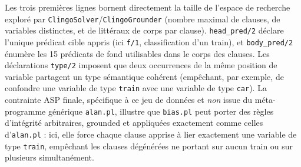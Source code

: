 Les trois premières lignes bornent directement la taille de l'espace de
recherche exploré par \texttt{ClingoSolver}/\texttt{ClingoGrounder}
(nombre maximal de clauses, de variables distinctes, et de littéraux de
corps par clause). \texttt{head\_pred/2} déclare l'unique prédicat
cible appris (ici \texttt{f/1}, classification d'un train), et
\texttt{body\_pred/2} énumère les 15 prédicats de fond utilisables dans
le corps des clauses. Les déclarations \texttt{type/2} imposent que
deux occurrences de la même position de variable partagent un type
sémantique cohérent (empêchant, par exemple, de confondre une variable
de type \texttt{train} avec une variable de type \texttt{car}). La
contrainte ASP finale, spécifique à ce jeu de données et \emph{non}
issue du méta-programme générique \texttt{alan.pl}, illustre que
\texttt{bias.pl} peut porter des règles d'intégrité arbitraires,
grounded et appliquées exactement comme celles d'\texttt{alan.pl} : ici,
elle force chaque clause apprise à lier exactement une variable de type
\texttt{train}, empêchant les clauses dégénérées ne portant sur aucun
train ou sur plusieurs simultanément.

%
%
